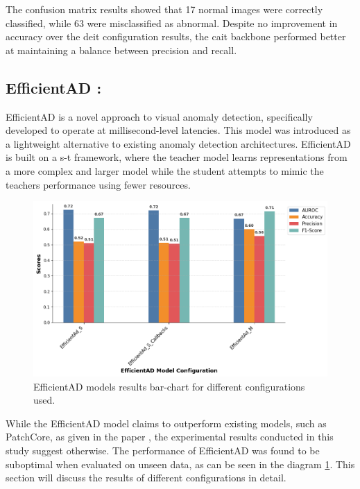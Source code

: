 The confusion matrix results showed that 17 normal images were correctly classified, while 63 were misclassified as abnormal. Despite no improvement in accuracy over the \gls{deit} configuration results, the \gls{cait} backbone performed better at maintaining a balance between precision and recall.

\subsection*{EfficientAD : }

EfficientAD is a novel approach to visual anomaly detection, specifically developed to operate at millisecond-level latencies. This model was introduced as a lightweight alternative to existing anomaly detection architectures. EfficientAD is built on a \gls{s-t} framework, where the teacher model learns representations from a more complex and larger model while the student attempts to mimic the teachers performance using fewer resources.

\begin{figure}[ht!]
    \centering
    \includegraphics[width=1.2\linewidth]{Rohit_Master_Thesis//Images/efficientad_model_results.png}
    \caption{EfficientAD models results bar-chart for different configurations used.}
    \label{fig:efficientad model results}
\end{figure}

While the EfficientAD model claims to outperform existing models, such as PatchCore\cite{roth2022totalrecallindustrialanomaly}, as given in the paper \cite{batzner2024efficientadaccuratevisualanomaly}, the experimental results conducted in this study suggest otherwise. The performance of EfficientAD was found to be suboptimal when evaluated on unseen data, as can be seen in the diagram \ref{fig:efficientad model results}. This section will discuss the results of different configurations in detail.

